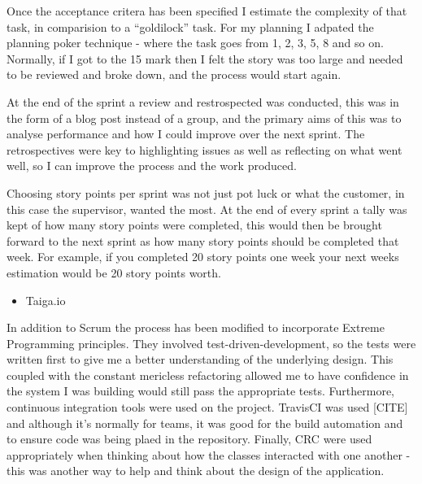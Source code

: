 Once the acceptance critera has been specified I estimate the complexity of that task, in comparision to a ``goldilock'' task.  For my planning I adpated the planning poker technique - where the task goes from 1, 2, 3, 5, 8 and so on. Normally, if I got to the 15 mark then I felt the story was too large and needed to be reviewed and broke down, and the process would start again.

At the end of the sprint a review and restrospected was conducted, this was in the form of a blog post instead of a group, and the primary aims of this was to analyse performance and how I could improve over the next sprint. The retrospectives were key to highlighting issues as well as reflecting on what went well, so I can improve the process and the work produced.

Choosing story points per sprint was not just pot luck or what the customer, in this case the supervisor, wanted the most. At the end of every sprint a tally was kept of how many story points were completed, this would then be brought forward to the next sprint as how many story points should be completed that week. For example, if you completed 20 story points one week your next weeks estimation would be 20 story points worth.


\begin{itemize}
  \item Taiga.io
\end{itemize}
In addition to Scrum the process has been modified to incorporate Extreme Programming principles. They involved test-driven-development, so the tests were written first to give me a better understanding of the underlying design. This coupled with the constant mericless refactoring allowed me to have confidence in the system I was building would still pass the appropriate tests. Furthermore, continuous integration tools were used on the project. TravisCI was used [CITE] and although it's normally for teams, it was good for the build automation and to ensure code was being plaed in the repository. Finally, CRC were used appropriately when thinking about how the classes interacted with one another - this was another way to help and think about the design of the application.

